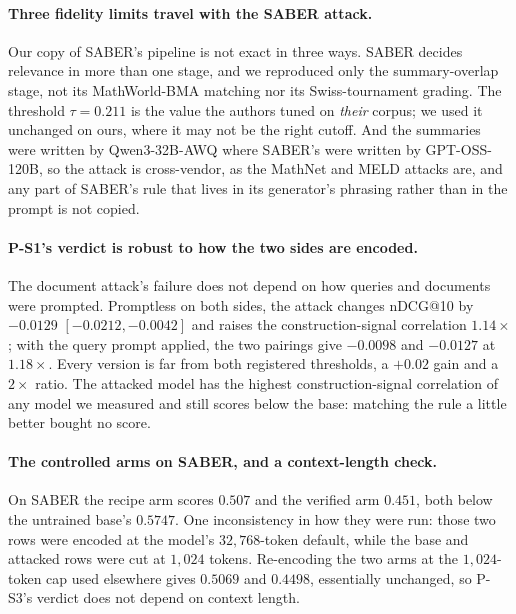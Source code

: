 \paragraph{Three fidelity limits travel with the SABER attack.}Our copy of SABER's pipeline is not exact in three ways. SABER decides relevance in more than one stage, and we reproduced only the summary-overlap stage, not its MathWorld-BMA matching nor its Swiss-tournament grading. The threshold $\tau = 0.211$ is the value the authors tuned on \emph{their} corpus; we used it unchanged on ours, where it may not be the right cutoff. And the summaries were written by Qwen3-32B-AWQ where SABER's were written by GPT-OSS-120B, so the attack is cross-vendor, as the MathNet and MELD attacks are, and any part of SABER's rule that lives in its generator's phrasing rather than in the prompt is not copied.

\paragraph{P-S1's verdict is robust to how the two sides are encoded.}The document attack's failure does not depend on how queries and documents were prompted. Promptless on both sides, the attack changes nDCG@10 by $-0.0129$ $[-0.0212, -0.0042]$ and raises the construction-signal correlation $1.14\times$; with the query prompt applied, the two pairings give $-0.0098$ and $-0.0127$ at $1.18\times$. Every version is far from both registered thresholds, a $+0.02$ gain and a $2\times$ ratio. The attacked model has the highest construction-signal correlation of any model we measured and still scores below the base: matching the rule a little better bought no score.

\paragraph{The controlled arms on SABER, and a context-length check.}On SABER the recipe arm scores $0.507$ and the verified arm $0.451$, both below the untrained base's $0.5747$. One inconsistency in how they were run: those two rows were encoded at the model's $32{,}768$-token default, while the base and attacked rows were cut at $1{,}024$ tokens. Re-encoding the two arms at the $1{,}024$-token cap used elsewhere gives $0.5069$ and $0.4498$, essentially unchanged, so P-S3's verdict does not depend on context length.


